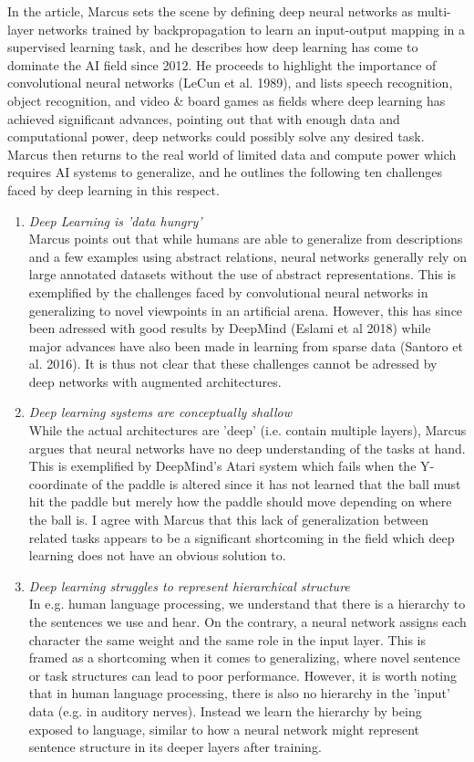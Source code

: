 \documentclass{article}
\begin{document}
In the article, Marcus sets the scene by defining deep neural networks as multi-layer networks trained by backpropagation to learn an input-output mapping in a supervised learning task, and he describes how deep learning has come to dominate the AI field since 2012. He proceeds to highlight the importance of convolutional neural networks (LeCun et al. 1989), and lists speech recognition, object recognition, and video \& board games as fields where deep learning has achieved significant advances, pointing out that with enough data and computational power, deep networks could possibly solve any desired task.
Marcus then returns to the real world of limited data and compute power which requires AI systems to generalize, and he outlines the following ten challenges faced by deep learning in this respect.
\begin{enumerate}[1]
\item \textit{Deep Learning is 'data hungry'}\\
Marcus points out that while humans are able to generalize from descriptions and a few examples using abstract relations, neural networks generally rely on large annotated datasets without the use of abstract representations. This is exemplified by the challenges faced by convolutional neural networks in generalizing to novel viewpoints in an artificial arena. However, this has since been adressed with good results by DeepMind (Eslami et al 2018) while major advances have also been made in learning from sparse data (Santoro et al. 2016). It is thus not clear that these challenges cannot be adressed by deep networks with augmented architectures.

\item \textit{Deep learning systems are conceptually shallow}\\
While the actual architectures are 'deep' (i.e. contain multiple layers), Marcus argues that neural networks have no deep understanding of the tasks at hand. This is exemplified by DeepMind's Atari system which fails when the Y-coordinate of the paddle is altered since it has not learned that the ball must hit the paddle but merely how the paddle should move depending on where the ball is. I agree with Marcus that this lack of generalization between related tasks appears to be a significant shortcoming in the field which deep learning does not have an obvious solution to.

\item \textit{Deep learning struggles to represent hierarchical structure}\\
In e.g. human language processing, we understand that there is a hierarchy to the sentences we use and hear. On the contrary, a neural network assigns each character the same weight and the same role in the input layer. This is framed as a shortcoming when it comes to generalizing, where novel sentence or task structures can lead to poor performance. However, it is worth noting that in human language processing, there is also no hierarchy in the 'input' data (e.g. in auditory nerves). Instead we learn the hierarchy by being exposed to language, similar to how a neural network might represent sentence structure in its deeper layers after training.


\end{enumerate}
\end{document}
